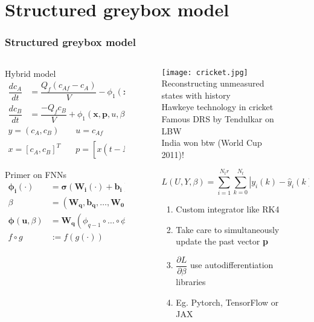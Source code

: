 \documentclass[dvipsnames, 9pt]{beamer}
\begin{document}
\section{Structured greybox model}
\begin{frame}
    \frametitle{Structured greybox model}
    
    \begin{columns}
    {   \begin{column}{0.57\textwidth}
        \begin{block}{Hybrid model}
\begin{align*}
\dfrac{dc_A}{dt} &= \dfrac{Q_f (c_{Af} - c_A)}{V} - \phi_1 (\mathbf{x, p}, u,\beta) \\
\dfrac{dc_B}{dt} &= \dfrac{-Q_f c_B}{V} + \phi_1 (\mathbf{x, p}, u,\beta) - 3 \phi_2 (\mathbf{x, p}, u,\beta) 
\end{align*}
\begin{align*}
y = (c_A, c_B) &\quad u = c_{Af} \\
x = [c_A, c_B]^T &\quad p = [x(t - N_p \Delta)^T, \ldots , x(t - \Delta)^T]^T 
\end{align*}
\end{block}
\begin{block}{Primer on FNNs}
\begin{align*}
\boldsymbol{\phi_i}(\cdot) &= \boldsymbol{\sigma}(\mathbf{W_i}(\cdot) + \mathbf{b_i}) \\
\beta &= (\mathbf{W_q, b_q, \ldots, W_0, b_0}) \\
\boldsymbol{\phi}(\mathbf{u}, \beta) &= \mathbf{W_q} (\phi_{q-1} \circ \ldots \circ \phi_0(\mathbf{u})) + \mathbf{b_q} \\
f \circ g &:= f(g(\cdot))
\end{align*}
\end{block}
        \end{column}}
        \begin{column}{0.4\textwidth}
            \begin{figure}
\texttt{[image: cricket.jpg]}
\scriptsize{Reconstructing unmeasured states with history \\ Hawkeye technology in cricket \\ Famous DRS by Tendulkar on LBW \\ India won btw (World Cup 2011)!}
\newline
\begin{alertblock}{}
\begin{equation*}
L(U,Y,\beta) = \sum_{i=1}^{N_tr} \sum_{k=0}^{N_t} |y_i(k) - \hat{y}_i (k)|^2
\end{equation*}
\begin{enumerate}
\scriptsize
\item Custom integrator like RK4
\item Take care to simultaneously update the past vector \textbf{p}
\item $\dfrac{\partial L}{\partial \beta}$ use autodifferentiation libraries
\item Eg. Pytorch, TensorFlow or JAX
\end{enumerate}
\end{alertblock}


\end{figure}
\end{column}
\end{columns}
\end{frame}
\end{document}
